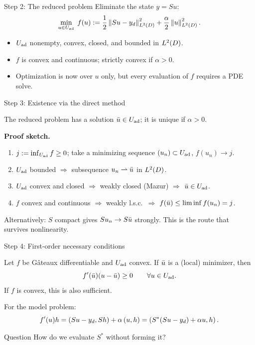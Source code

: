 \documentclass[main.tex]{subfiles}
\begin{document}
\begin{frame}{Step 2: The reduced problem}
  Eliminate the state $y = Su$:
  \[
    \min_{u \in U_{\mathrm{ad}}}\; f(u) := \frac12 \left\lVert Su - y_d \right\rVert_{L^2(D)}^2 + \frac{\alpha}{2}\left\lVert u \right\rVert_{L^2(D)}^2 .
  \]
  \begin{itemize}
    \item $U_{\mathrm{ad}}$ nonempty, convex, closed, and bounded in $L^2(D)$.
    \item $f$ is convex and continuous; strictly convex if $\alpha > 0$.
    \item Optimization is now over $u$ only, but every evaluation of $f$ requires a PDE solve.
  \end{itemize}
\end{frame}

\begin{frame}{Step 3: Existence via the direct method}
  \begin{theorem}
    The reduced problem has a solution $\bar u \in U_{\mathrm{ad}}$; it is unique if $\alpha > 0$.
  \end{theorem}
  \textbf{Proof sketch.}
  \begin{enumerate}
    \item $j := \inf_{U_{\mathrm{ad}}} f \ge 0$; take a minimizing sequence $(u_n) \subset U_{\mathrm{ad}}$, $f(u_n) \to j$.
    \item $U_{\mathrm{ad}}$ bounded $\Rightarrow$ subsequence $u_n \rightharpoonup \bar u$ in $L^2(D)$.
    \item $U_{\mathrm{ad}}$ convex and closed $\Rightarrow$ weakly closed (Mazur) $\Rightarrow$ $\bar u \in U_{\mathrm{ad}}$.
    \item $f$ convex and continuous $\Rightarrow$ weakly l.s.c.\ $\Rightarrow$ $f(\bar u) \le \liminf f(u_n) = j$.
  \end{enumerate}
  \vspace{0.5ex}
  {\small Alternatively: $S$ compact gives $Su_n \to S\bar u$ strongly. This is the route that survives nonlinearity.}
\end{frame}

\begin{frame}{Step 4: First-order necessary conditions}
  \begin{theorem}
    Let $f$ be G\^ateaux differentiable and $U_{\mathrm{ad}}$ convex. If $\bar u$ is a (local) minimizer, then
    \[
      f'(\bar u)(u - \bar u) \ge 0 \qquad \forall u \in U_{\mathrm{ad}} .
    \]
    If $f$ is convex, this is also sufficient.
  \end{theorem}
  For the model problem:
  \[
    f'(u)h = \left( Su - y_d, Sh \right) + \alpha\left( u, h \right) = \left( S^*(Su - y_d) + \alpha u, h \right) .
  \]
  \begin{alertblock}{Question}
    How do we evaluate $S^*$ without forming it?
  \end{alertblock}
\end{frame}
\end{document}
